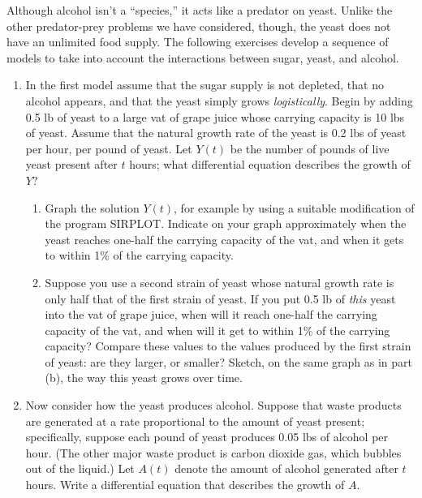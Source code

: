 	Although alcohol isn't a ``species,'' it acts like a predator on yeast.  Unlike the other predator-prey problems we have considered, though, the yeast does not have an unlimited food supply.  The following exercises develop a sequence of models to take into account the interactions between sugar, yeast, and alcohol.  


\begin{enumerate}
\item In the first model assume that the sugar supply is not depleted, that no alcohol appears, and that the yeast simply grows {\em logistically}.  Begin by adding 0.5 lb of yeast to a large vat of grape juice whose carrying capacity is 10 lbs of yeast.  Assume that the natural growth rate of the yeast is 0.2 lbs of yeast per hour, per pound of yeast.  Let $Y(t)$ be the number of pounds of live yeast present after $t$ hours; what differential equation describes the growth of $Y$?

  \begin{enumerate}
  \item Graph the solution $Y(t)$, for example by using a suitable modification of the program SIRPLOT.  Indicate on your graph approximately when the yeast reaches one-half the carrying capacity of the vat, and when it gets to within 1\% of the carrying capacity.

  \item Suppose you use a second strain of yeast whose natural growth rate is only half that of the first strain of yeast.  If you put 0.5 lb of {\em this\/} yeast into the vat of grape juice, when will it reach one-half the carrying capacity of the vat, and when will it get to within 1\% of the carrying capacity?  Compare these values to the values produced by the first strain of yeast: are they larger, or smaller?  Sketch, on the same graph as in part (b), the way this yeast grows over time.



\end{enumerate}
\item Now consider how the yeast produces alcohol.  Suppose that waste products are generated at a rate proportional to the amount of yeast present; specifically, suppose each pound of yeast produces 0.05 lbs of alcohol per hour.  (The other major waste product is carbon dioxide gas, which bubbles out of the liquid.)  Let $A(t)$ denote the amount of alcohol generated after $t$ hours.  Write a differential equation that describes the growth of $A$.


\end{enumerate}
